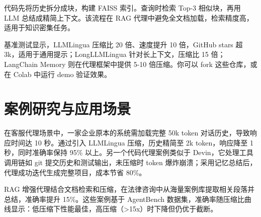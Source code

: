 代码先将历史拆分成块，构建 FAISS 索引。查询时检索 Top-3 相似块，再用 LLM 总结成精简上下文。该流程在 RAG 代理中避免全文档加载，检索精度高，适用于知识密集任务。\par
基准测试显示，LLMLingua 压缩比 20 倍、速度提升 10 倍，GitHub stars 超 3k，适用于通用提示；LongLLMLingua 针对长上下文，压缩比 15 倍；LangChain Memory 则在代理框架中提供 5-10 倍压缩。你可以 fork 这些仓库，或在 Colab 中运行 demo 验证效果。\par
\chapter{案例研究与应用场景}
在客服代理场景中，一家企业原本的系统需加载完整 50k token 对话历史，导致响应时间达 10 秒。通过引入 LLMLingua 压缩，历史精简至 2k token，响应降至 1 秒，同时准确率保持 95\%{} 以上。另一个代码代理案例类似于 Devin，它处理工具调用链如 git 提交历史和测试输出，未压缩时 token 爆炸崩溃；采用记忆总结后，代理成功迭代生成完整项目，成本节省 80\%{}。\par
RAG 增强代理结合文档检索和压缩，在法律咨询中从海量案例库提取相关段落并总结，准确率提升 15\%{}。这些案例基于 AgentBench 数据集，准确率随压缩比曲线显示：低压缩下性能最佳，高压缩（>15x）时下降但仍优于截断。\par
